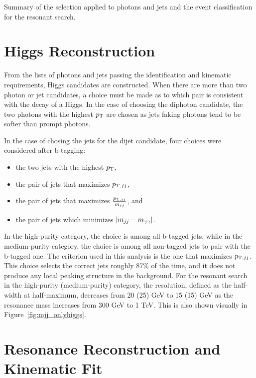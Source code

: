 \begin{table}[ht]
  \centering
  \renewcommand{\arraystretch}{1.4}
  \caption{Summary of the selection applied to photons and jets and the event classification
for the resonant search.}
  
  \label{table:gencut}
\end{table}

\section{Higgs Reconstruction\label{sec:higgsreconstruction}}

From the lists of photons and jets passing the identification and kinematic requirements, Higgs
candidates are constructed. When there are more than two photon or jet candidates, a choice
must be made as to which pair is consistent with the decay of a Higgs. In the case
of choosing the diphoton candidate, the two photons with the highest $p_{\rm T}$ are chosen
as jets faking photons tend to be softer than prompt photons.

In the case of chosing the jets for the dijet candidate, four choices were considered after b-tagging:
\begin{itemize}
\item the two jets with the highest $p_{\rm T}$,
\item the pair of jets that maximizes $p_{{\rm T},jj}$,
\item the pair of jets that maximizes $\frac{p_{{\rm T},jj}}{m_{jj}}$, and
\item the pair of jets which minimizes $|m_{jj}-m_{\gamma\gamma}|$.
\end{itemize}
In the high-purity category, the choice is among all b-tagged jets,
while in the medium-purity category, the
choice is among all non-tagged jets to pair with the b-tagged one.
The criterion used in this analysis is the one that maximizes $p_{{\rm T},jj}$. 
This choice selects the correct jets roughly 87\% of the time, and it does not produce any local peaking
structure in the background. For the resonant search
in the high-purity (medium-purity) category, the resolution, defined as the half-width at half-maximum,
decreases from 20 (25) GeV to 15 (15) GeV as the resonance mass increases from 300 GeV to 1 TeV.
This is also shown visually in Figure~\ref{fig:mjj_onlyhiggs}.

\section{Resonance Reconstruction and Kinematic Fit\label{sec:Xreconstruction}}

